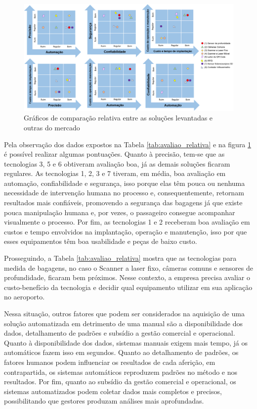         \begin{figure}[h]
           \centering
           \includegraphics[width=1\textwidth]{imagens/graficos_comparacao_entre_tecnologias.png}
           \caption{Gráficos de comparação relativa entre as soluções levantadas e outras do mercado}
          \label{fig:graficos_comparacao_entre_tecnologias}
        \end{figure}


Pela observação dos dados expostos na Tabela \ref{tab:avaliao_relativa} e na figura \ref{fig:graficos_comparacao_entre_tecnologias} é possível realizar algumas pontuações. Quanto à precisão, tem-se que as tecnologias 3, 5 e 6 obtiveram avaliação boa, já as demais soluções ficaram regulares. As tecnologias 1, 2, 3 e 7 tiveram, em média, boa avaliação em automação, confiabilidade e segurança, isso porque elas têm pouca ou nenhuma necessidade de intervenção humana no processo e, consequentemente, retornam resultados mais confiáveis, promovendo a segurança das bagagens já que existe pouca manipulação humana e, por vezes, o passageiro consegue acompanhar visualmente o processo. Por fim, as tecnologias 1 e 2 receberam boa avaliação em custos e tempo envolvidos na implantação, operação e manutenção, isso por que esses equipamentos têm boa usabilidade e peças de baixo custo. 

Prosseguindo, a Tabela \ref{tab:avaliao_relativa} mostra que as tecnologias para medida de bagagens, no caso o  Scanner a laser fixo, câmeras comuns e sensores de profundidade, ficaram bem próximos. Nesse contexto, a empresa precisa avaliar o custo-benefício da tecnologia e decidir qual equipamento utilizar em sua aplicação no aeroporto.

Nessa situação, outros fatores que podem ser considerados na aquisição de uma solução automatizada em detrimento de uma manual são a disponibilidade dos dados, detalhamento de padrões e subsídio a gestão comercial e operacional. Quanto à disponibilidade dos dados, sistemas manuais exigem mais tempo, já os automáticos fazem isso em segundos. Quanto ao detalhamento de padrões, os fatores humanos podem influenciar os resultados de cada aferição, em contrapartida, os sistemas automáticos reproduzem padrões no método e nos resultados. Por fim, quanto ao subsídio da gestão comercial e operacional, os sistemas automatizados podem coletar dados mais completos e precisos, possibilitando que gestores produzam análises mais aprofundadas.





